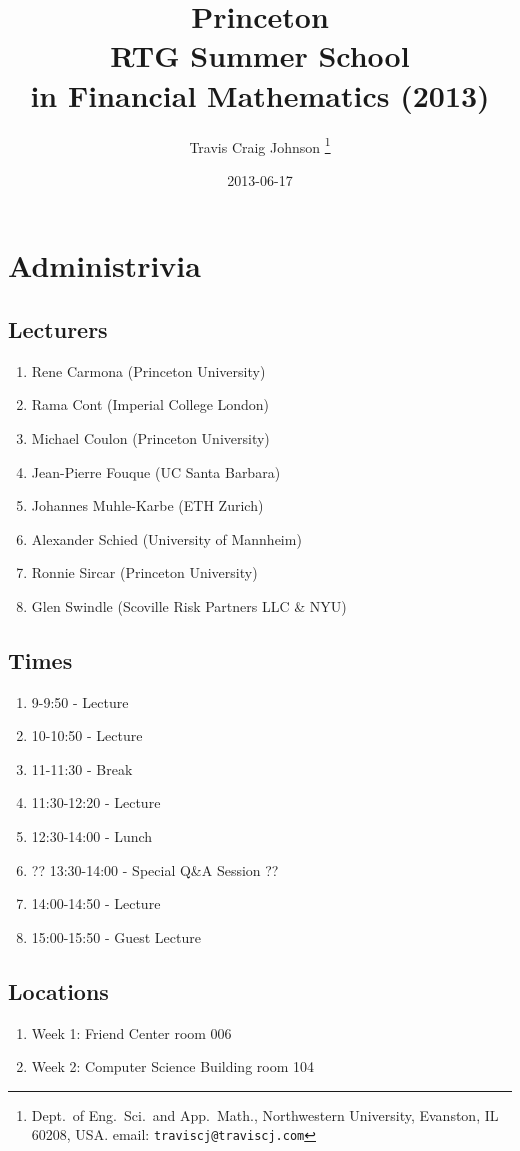 \documentclass[twocolumn,openany]{book}
\title{Princeton \\ RTG Summer School \\in Financial Mathematics (2013)}
\author{ Travis Craig Johnson \thanks{Dept.~of Eng.~Sci.~and App.~Math., Northwestern University, Evanston, IL 60208, USA. email: \texttt{traviscj@traviscj.com}}}
\date{2013-06-17}
\begin{document}
\ifpdf
{}
\else
{}
\fi

\maketitle

\chapter{Administrivia}
\section{Lecturers}
\begin{enumerate}
	\item Rene Carmona (Princeton University)
	\item Rama Cont (Imperial College London)
	\item Michael Coulon (Princeton University)
	\item Jean-Pierre Fouque (UC Santa Barbara)
	\item Johannes Muhle-Karbe (ETH Zurich)
	\item Alexander Schied (University of Mannheim)
	\item Ronnie Sircar (Princeton University)
	\item Glen Swindle (Scoville Risk Partners LLC \& NYU)
\end{enumerate}
\section{Times}
\begin{enumerate}
	\item 9-9:50 - Lecture
	\item 10-10:50 - Lecture
	\item 11-11:30 - Break
	\item 11:30-12:20 - Lecture
	\item 12:30-14:00 - Lunch
	\item ?? 13:30-14:00 - Special Q\&A Session ??
	\item 14:00-14:50 - Lecture
	\item 15:00-15:50 - Guest Lecture
\end{enumerate}

\section{Locations}
\begin{enumerate}
	\item Week 1: Friend Center room 006
	\item Week 2: Computer Science Building room 104
\end{enumerate}
\end{document}
